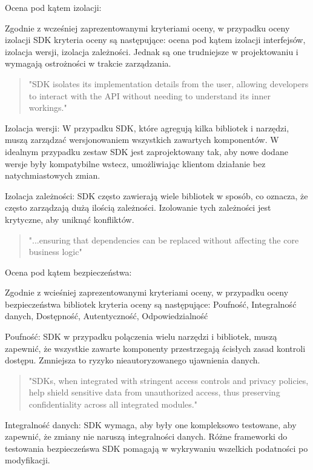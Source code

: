 \documentclass[runningheads,12pt]{llncs}
\begin{document}
Ocena pod kątem izolacji: 

Zgodnie z wcześniej zaprezentowanymi kryteriami oceny, w przypadku oceny izolacji SDK kryteria oceny są następujące: ocena pod kątem izolacji interfejsów, izolacja wersji, izolacja zależności. Jednak są one trudniejsze w projektowaniu i wymagają ostrożności w trakcie zarządzania.

\begin{quote}
    "SDK isolates its implementation details from the user, allowing developers to interact with the API without needing to understand its inner workings." ~\cite[p. 75]{Essential}
\end{quote}

Izolacja wersji: W przypadku SDK, które agregują kilka bibliotek i narzędzi, muszą zarządzać wersjonowaniem wszystkich zawartych komponentów. W idealnym przypadku zestaw SDK jest zaprojektowany tak, aby nowe dodane wersje były kompatybilne wstecz, umożliwiając klientom działanie bez natychmiastowych zmian.

Izolacja zależności: SDK często zawierają wiele bibliotek w sposób, co oznacza, że często zarządzają dużą ilością zależności. Izolowanie tych zależności jest krytyczne, aby uniknąć konfliktów.

\begin{quote}
    "...ensuring that dependencies can be replaced without affecting the core business logic" ~\cite[p. 218]{martin2008clean}
\end{quote}
Ocena pod kątem bezpieczeństwa: 

Zgodnie z wcieśniej zaprezentowanymi kryteriami oceny, w przypadku oceny bezpieczeństwa bibliotek kryteria oceny są następujące: Poufność, Integralność danych, Dostępność, Autentyczność, Odpowiedzialność

Poufność: SDK w przypadku polączenia wielu narzędzi i bibliotek, muszą zapewnić, że wszystkie zawarte komponenty przestrzegają ścisłych zasad kontroli dostępu. Zmniejsza to ryzyko nieautoryzowanego ujawnienia danych.

\begin{quote}
    "SDKs, when integrated with stringent access controls and privacy policies, help shield sensitive data from unauthorized access, thus preserving confidentiality across all integrated modules." ~\cite[para 4]{azure2020}
\end{quote}

Integralność danych: SDK wymaga, aby były one kompleksowo testowane, aby zapewnić, że zmiany nie naruszą integralności danych. Różne frameworki do testowania bezpieczeńswa SDK pomagają w wykrywaniu wszelkich podatności po modyfikacji.
\end{document}
